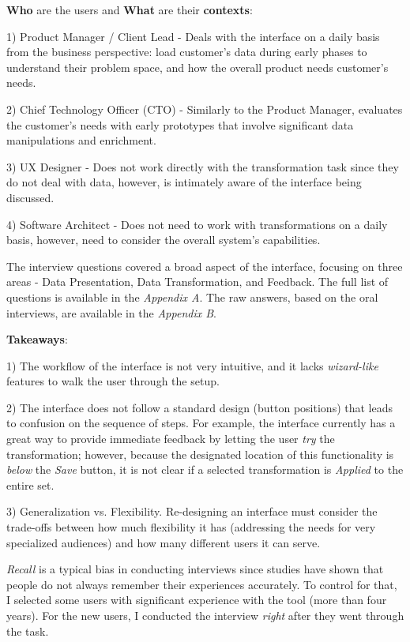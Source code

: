 \documentclass[12pt,letterpaper]{article}
\begin{document}
\textbf{Who} are the users and \textbf{What} are their \textbf{contexts}:

1) Product Manager / Client Lead - Deals with the interface on a daily basis from the business perspective: load customer's data during early phases to understand their problem space, and how the overall product needs customer's needs.

2) Chief Technology Officer (CTO) - Similarly to the Product Manager, evaluates the customer's needs with early prototypes that involve significant data manipulations and enrichment.

3) UX Designer - Does not work directly with the transformation task since they do not deal with data, however, is intimately aware of the interface being discussed.   

4) Software Architect - Does not need to work with transformations on a daily basis, however, need to consider the overall system's capabilities.

The interview questions covered a broad aspect of the interface, focusing on three areas - Data Presentation, Data Transformation, and Feedback. The full list of questions is available in the \textit{Appendix A}. The raw answers, based on the oral interviews, are available in the \textit{Appendix B}. 

\textbf{Takeaways}:

1) The workflow of the interface is not very intuitive, and it lacks \textit{wizard-like} features to walk the user through the setup.

2) The interface does not follow a standard design (button positions) that leads to confusion on the sequence of steps. For example, the interface currently has a great way to provide immediate feedback by letting the user \textit{try} the transformation; however, because the designated location of this functionality is \textit{below} the \textit{Save} button, it is not clear if a selected transformation is \textit{Applied} to the entire set.

3) Generalization vs. Flexibility. Re-designing an interface must consider the trade-offs between how much flexibility it has (addressing the needs for very specialized audiences) and how many different users it can serve.

\textit{Recall} is a typical bias in conducting interviews since studies have shown that people do not always remember their experiences accurately. To control for that, I selected some users with significant experience with the tool (more than four years). For the new users, I conducted the interview \textit{right} after they went through the task.  
\end{document}
